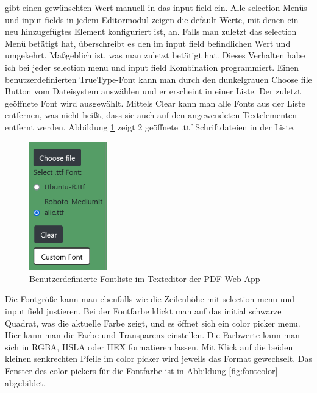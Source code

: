 gibt einen gewünschten Wert manuell in das input field ein. Alle selection Menüs und input fields in jedem Editormodul zeigen die default Werte, mit denen ein neu hinzugefügtes Element konfiguriert ist, an. Falls man zuletzt das selection Menü betätigt hat, überschreibt es den im input field befindlichen Wert und umgekehrt. Maßgeblich ist, was man zuletzt betätigt hat. Dieses Verhalten habe ich bei jeder selection menu und input field Kombination programmiert. Einen benutzerdefinierten TrueType-Font kann man durch den dunkelgrauen Choose file Button vom Dateisystem auswählen und er erscheint in einer Liste. Der zuletzt geöffnete Font wird ausgewählt. Mittels Clear kann man alle Fonts aus der Liste entfernen, was nicht heißt, dass sie auch auf den angewendeten Textelementen entfernt werden. Abbildung \ref{fig:custom-font} zeigt 2 geöffnete .ttf Schriftdateien in der Liste.

\begin{figure}[!htbp]
	\centering
	\includegraphics[width=0.3\textwidth]{"images/custom-font.png"}
	\caption{Benutzerdefinierte Fontliste im Texteditor der PDF Web App}
	\label{fig:custom-font}
\end{figure}

Die Fontgröße kann man ebenfalls wie die Zeilenhöhe mit selection menu und input field justieren. Bei der Fontfarbe klickt man auf das initial schwarze Quadrat, was die aktuelle Farbe zeigt, und es öffnet sich ein color picker menu. Hier kann man die Farbe und Transparenz einstellen. Die Farbwerte kann man sich in RGBA, HSLA oder HEX formatieren lassen. Mit Klick auf die beiden kleinen senkrechten Pfeile im color picker wird jeweils das Format gewechselt. Das Fenster des color pickers für die Fontfarbe ist in Abbildung \ref{fig:fontcolor} abgebildet. 

